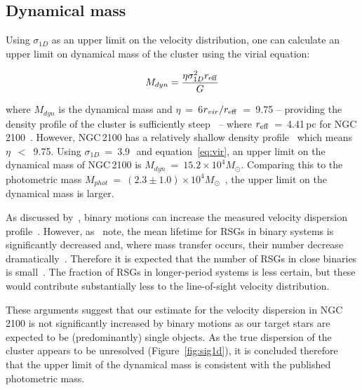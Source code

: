 
\subsection{Dynamical mass} %
\label{sub:dynamical_mass}
Using $\sigma_{1D}$ as an upper limit on the velocity distribution, one can calculate an upper limit on dynamical mass of the cluster using the virial equation:

\begin{equation}
  M_{dyn} = \frac{\eta\sigma_{1D}^{2}r_{\rm eff}}{G}
  \label{eq:vir}
\end{equation}

\noindent where $M_{dyn}$ is the dynamical mass and $\eta$~=~6$r_{vir}/r_{\rm eff}$~=~9.75 -- providing the density profile of the cluster is sufficiently steep~\citep{2010ARA&A..48..431P} --
where $r_{\rm eff}$~=~4.41\,pc for NGC\,2100~\citep{2005ApJS..161..304M}.
However, NGC\,2100 has a relatively shallow density profile~\citep[$\gamma$~=~$2.44\pm0.14$;][]{2003MNRAS.338...85M}
which means $\eta$~$<$~9.75.
Using $\sigma_{1D}$~=~$3.9$\,\kms~and equation~\ref{eq:vir}, an upper limit on the dynamical mass of NGC\,2100 is $M_{dyn}$~=~$15.2\times 10^{4}M_{\odot}$.
Comparing this to the photometric mass $M_{phot}$~=~$(2.3\pm1.0)\times 10^{4}M_{\odot}$~\citep{2005ApJS..161..304M},
the upper limit on the dynamical mass is larger.

As discussed by~\citet{2010MNRAS.402.1750G}, binary motions can increase the measured velocity dispersion profile~\citep[e.g. see][]{2012A&A...546A..73H}.
However, as~\citet{2010MNRAS.402.1750G} note, the mean lifetime for RSGs in binary systems is significantly decreased and, where mass transfer occurs, their number decrease dramatically~\citep{2008MNRAS.384.1109E}.
Therefore it is expected that the number of RSGs in close binaries is small~\citep{1979MNRAS.186..831F,2009ApJ...696.2014D}.
The fraction of RSGs in longer-period systems is less certain, but these would contribute substantially less to the line-of-sight velocity distribution.

These arguments suggest that our estimate for the velocity dispersion in NGC\,2100 is not significantly increased by binary motions as our target stars are expected to be (predominantly) single objects. As the true dispersion of the cluster appears to be unresolved (Figure~\ref{fig:sig1d}), it is concluded therefore that the upper limit of the dynamical mass is consistent with the published photometric mass.

